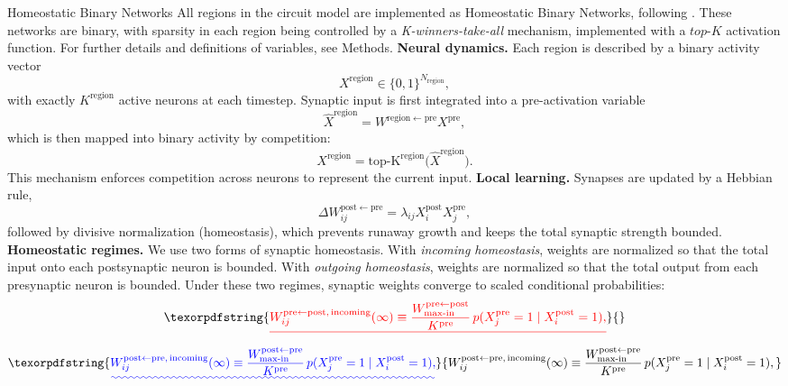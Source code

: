 \documentclass{article}
\providecommand{\DIFaddtex}[1]{{\protect\color{blue}\uwave{#1}}} %
\providecommand{\DIFdeltex}[1]{{\protect\color{red}\sout{#1}}}                      %
\providecommand{\DIFaddbegin}{} %
\providecommand{\DIFaddend}{} %
\providecommand{\DIFdelbegin}{} %
\providecommand{\DIFdelend}{} %
\providecommand{\DIFadd}[1]{\texorpdfstring{\DIFaddtex{#1}}{#1}} %
\providecommand{\DIFdel}[1]{\texorpdfstring{\DIFdeltex{#1}}{}} %
\begin{document}
\begin{technicalbox}{Homeostatic Binary Networks}
All regions in the circuit model are implemented as Homeostatic Binary Networks, following . These networks are binary, with sparsity in each region being controlled by a \textit{K-winners-take-all} mechanism, implemented with a $top$-$K$ activation function. For further details and definitions of variables, see Methods.
\newline\newline
\textbf{Neural dynamics.} Each region is described by a binary activity vector
\[
X^\mathrm{region}\in\{0,1\}^{N_\mathrm{region}},
\]
with exactly $K^\mathrm{region}$ active neurons at each timestep. Synaptic input is first integrated into a pre-activation variable
\[
\hat{X}^\mathrm{region}
=
W^{\mathrm{region}\leftarrow\mathrm{pre}}X^\mathrm{pre},
\]
which is then mapped into binary activity by competition:
\[
X^\mathrm{region}
=
\operatorname{top\text{-}K^\mathrm{region}}
\big(\hat{X}^\mathrm{region}\big).
\]
This mechanism enforces competition across neurons to represent the current \DIFaddbegin \DIFadd{synaptic }\DIFaddend input.
\newline\newline
\textbf{Local learning.} Synapses are updated by a Hebbian rule,
\[
\Delta W_{ij}^{\mathrm{post}\leftarrow\mathrm{pre}}
=
\lambda_{ij}X_i^\mathrm{post}X_j^\mathrm{pre},
\]
followed by divisive normalization (homeostasis), which prevents runaway growth and keeps the total synaptic strength bounded.
\newline\newline
\textbf{Homeostatic regimes.} We use two forms of synaptic homeostasis. With \textit{incoming homeostasis}, weights are normalized so that the total input onto each postsynaptic neuron is bounded. With \textit{outgoing homeostasis}, weights are normalized so that the total output from each presynaptic neuron is bounded. Under these two regimes, synaptic weights converge to scaled conditional probabilities:
\DIFdelbegin \[
\DIFdel{W_{ij}^{\mathrm{pre}\leftarrow\mathrm{post},\,\mathrm{incoming}}(\infty)
\equiv
\frac{W_{\mathrm{max\text{-}in}}^{\mathrm{pre}\leftarrow\mathrm{post}}}{K^\mathrm{pre}}
\,p(X_j^\mathrm{pre}=1\mid X_i^\mathrm{post}=1),
}\]%
\DIFdelend \DIFaddbegin \[
\DIFadd{W_{ij}^{\mathrm{post}\leftarrow\mathrm{pre},\,\mathrm{incoming}}(\infty)
\equiv
\frac{W_{\mathrm{max\text{-}in}}^{\mathrm{post}\leftarrow\mathrm{pre}}}{K^\mathrm{pre}}
\,p(X_j^\mathrm{pre}=1\mid X_i^\mathrm{post}=1),
}\]
\end{technicalbox}
\end{document}
